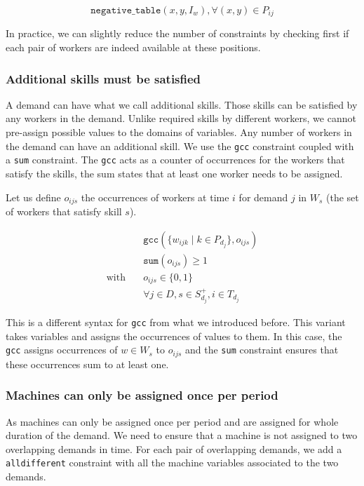 \documentclass[../../thesis.tex]{subfiles}
\begin{document}
\begin{equation}
  \texttt{negative\_table}(x, y, I_{w}),  \forall (x, y) \in P_{ij}
\end{equation}

In practice, we can slightly reduce the number of constraints by checking first if each pair of workers are indeed available at these positions.

\subsubsection{Additional skills must be satisfied}

A demand can have what we call additional skills. Those skills can be 
satisfied by any workers in the demand. Unlike required skills by different workers,
we cannot pre-assign possible values to the domains of variables. Any number of workers in the demand can have an additional skill.
We use the \texttt{gcc} constraint coupled with a \texttt{sum} constraint.
The \texttt{gcc} acts as a counter of occurrences for the workers that satisfy the skills,
the sum states that at least one worker needs to be assigned.

Let us define $o_{ijs}$ the occurrences of workers at time $i$ for demand $j$ in $W_s$ (the set of workers that satisfy skill $s$).

\begin{align}
  &\texttt{gcc}(\{ w_{ijk} \mid k \in P_{d_j} \}, o_{ijs}) \\ 
  &\texttt{sum}(o_{ijs}) \geq 1 \\
  \text{with} \quad & o_{ijs} \in \{ 0, 1 \} \\
  & \forall j \in D, s \in S^{+}_{d_j}, i \in T_{d_j}
\end{align}

This is a different syntax for \texttt{gcc} from what we introduced before. This variant takes 
variables and assigns the occurrences of values to them. In this case, the \texttt{gcc} assigns 
occurrences of $w \in W_s$ to $o_{ijs}$ and the \texttt{sum} constraint ensures that 
these occurrences sum to at least one.


\subsubsection{Machines can only be assigned once per period}

As machines can only be assigned once per period and are assigned for whole duration of the demand. We need 
to ensure that a machine is not assigned to two overlapping demands in time.
For each pair of overlapping demands,
we add a \texttt{alldifferent} constraint with all the machine variables associated to the two demands.
\end{document}
